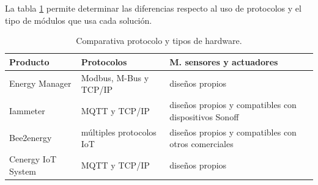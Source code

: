 
La tabla \ref{tab:tabla-resultado2} permite determinar las diferencias respecto al uso de protocolos y el tipo de módulos que usa cada solución. 


\begin{table}[h]
	\centering
	\caption[Comparativa de soluciones entre protocolo y hardware]{Comparativa protocolo y tipos de hardware.}
	\begin{tabular}{l p{5cm} p{5cm}}    
		\toprule
		\textbf{Producto} 	 & \textbf{Protocolos}  & \textbf{M. sensores y actuadores}  \\
		\midrule
		Energy Manager & Modbus, M-Bus y TCP/IP 	& diseños propios \\		
		Iammeter	 & MQTT y TCP/IP	&diseños propios y compatibles con       dispositivos Sonoff   \\
		Bee2energy	 & múltiples protocolos IoT		& diseños propios y compatibles con otros comerciales  \\
		\rowcolor[HTML]{ebedef}Cenergy IoT	System & MQTT y TCP/IP		&diseños propios  \\
		\bottomrule
		\hline
	\end{tabular}
	\label{tab:tabla-resultado2}
\end{table}
